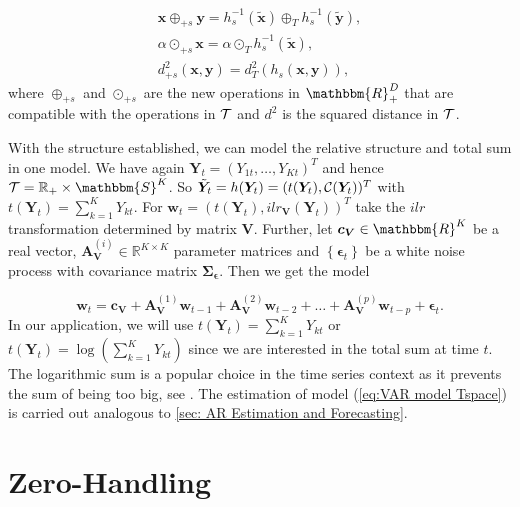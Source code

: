 \begin{gather}
\bm{x} \oplus_{+s} \bm{y} = h_s^{-1}(\tilde{\bm{x}}) \oplus_T  h_s^{-1}(\tilde{\bm{y}}), \\
\alpha \odot_{+s} \bm{x} = \alpha \odot_T h_s^{-1}(\tilde{\bm{x}}), \\
d_{+s}^2(\bm{x},\bm{y}) = d_T^2(h_s(\bm{x},\bm{y})),
\label{eq:Vector Space Operations sum}
\end{gather}
%
where $\oplus_{+s}$ and $\odot_{+s}$ are the new operations in $\mathbbm{R}_+^D$ that are compatible with the operations in $\mathcal{T}$ and $d^2$ is the squared distance in $\mathcal{T}$. 

With the structure established, we can model the relative structure and total sum in one model.  We have again $\bm{Y}_t=(Y_{1t},\ldots,Y_{Kt})^T$ and hence $\Tsp = \mathbb{R}_+ \times \mathbbm{S}^K$. So $\tilde{\bm{Y}}_t=h(\bm{Y}_t)=(t(\bm{Y}_t),\mathcal{C}(\bm{Y}_t))^T$ with $t(\bm{Y}_t)=\sum_{k=1}^K Y_{kt}$. For $\bm{w}_t =(t(\bm{Y}_t),ilr_{\bm{V}}(\bm{Y}_t))^T$ take the $ilr$ transformation determined by matrix $\bm{V}$. Further, let $\bm{c}_{\bm{V}} \in \mathbbm{R}^K$ be a real vector, $\textbf{A}_{\textbf{V}}^{(i)} \in \mathbb{R}^{K \times K}$ parameter matrices and $\left\{\bm{\epsilon}_t\right\}$ be a white noise process with covariance matrix $\bm{\Sigma_\epsilon}$. Then we get the model 

\begin{equation}
\textbf{w}_t = \textbf{c}_{\textbf{V}} + \textbf{A}_{\textbf{V}}^{(1)}\textbf{w}_{t-1} + \textbf{A}_{\textbf{V}}^{(2)}\textbf{w}_{t-2} + \ldots + \textbf{A}_{\textbf{V}}^{(p)}\textbf{w}_{t-p} + \bm{\epsilon}_{t}.
\label{eq:VAR model Tspace}
\end{equation}
%
In our application, we will use $t(\bm{Y}_t)=\sum_{k=1}^K Y_{kt}$ or $t(\bm{Y}_t)=\log(\sum_{k=1}^K Y_{kt})$ since we are interested in the total sum at time $t$. The logarithmic sum is a popular choice in the time series context as it prevents the sum of being too big, see \textcite{Kynclova:2015}. The estimation of model (\ref{eq:VAR model Tspace}) is carried out analogous to \ref{sec: AR Estimation and Forecasting}. 

\section{Zero-Handling}
\label{sec: Zero-Handling}

